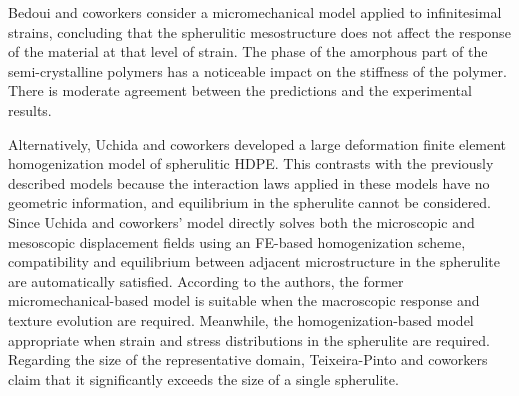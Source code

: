 Bedoui and coworkers \citep{bedouiMicromechanicalModelingIsotropic2006} consider a micromechanical model applied to infinitesimal strains, concluding that the spherulitic mesostructure does not affect the response of the material at that level of strain.
The phase of the amorphous part of the semi-crystalline polymers has a noticeable impact on the stiffness of the polymer.
There is moderate agreement between the predictions and the experimental results.

Alternatively, Uchida and coworkers \citep{uchidaMicroMesoMacroscopic2013} developed a large deformation finite element homogenization model of spherulitic HDPE.
This contrasts with the previously described models because the interaction laws applied in these models have no geometric information, and equilibrium in the spherulite cannot be considered.
Since Uchida and coworkers' model directly solves both the microscopic and mesoscopic displacement fields using an FE-based homogenization scheme, compatibility and equilibrium between adjacent microstructure in the spherulite are automatically satisfied.
According to the authors, the former micromechanical-based model is suitable when the macroscopic response and texture evolution are required.
Meanwhile, the homogenization-based model appropriate when strain and stress distributions in the spherulite are required.
Regarding the size of the representative domain, Teixeira-Pinto and coworkers \citep{teixeira-pintoSizeEstimationRepresentative2016} claim that it significantly exceeds the size of a single spherulite.

  \newpage\null\thispagestyle{blank}\newpage
